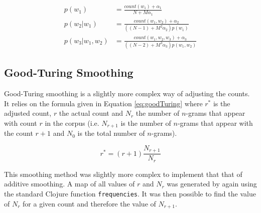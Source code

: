 \begin{subequations}
\begin{align}
p(w_{1})&=\frac{count(w_{1})+\alpha_{1}}{N+M\alpha_{1}} \label{eq:1-gramAdditiveSmoothing}
\\
p(w_{2}| w_{1})&=\frac{count(w_{1}, w_{2})+\alpha_{2}}{((N-1)+M^{2}\alpha_{2})p(w_{1})} \label{eq:2-gramAdditiveSmoothing}
\\
p(w_{3}| w_{1}, w_{2}) &= \frac{count(w_{1}, w_{2}, w_{3})+\alpha_{3}}{((N-2)+M^{3}\alpha_{3})p(w_{1}, w_{2})} \label{eq:3-gramAdditiveSmoothing}
\end{align}
\end{subequations}

%
%

\subsection{Good-Turing Smoothing} \label{sec:goodTuringSmoothing}

Good-Turing smoothing is a slightly more complex way of adjusting the counts. It relies on the formula given in Equation \ref{eq:goodTuring} where $r^{*}$ is the adjusted count, $r$ the actual count and $N_{r}$ the number of $n$-grams that appear with count $r$ in the corpus (i.e. $N_{r+1}$ is the number of $n$-grams that appear with the count $r+1$ and $N_{0}$ is the total number of $n$-grams).

\begin{equation}
r^{*}=(r+1)\frac{N_{r+1}}{N_{r}}
\label{eq:goodTuring}
\end{equation}


This smoothing method was slightly more complex to implement that that of additive smoothing. A map of all values of $r$ and $N_{r}$ was generated by again using the standard Clojure function \lstinline!frequencies!. It was then possible to find the value of $N_{r}$ for a given count and therefore the value of $N_{r+1}$. 

